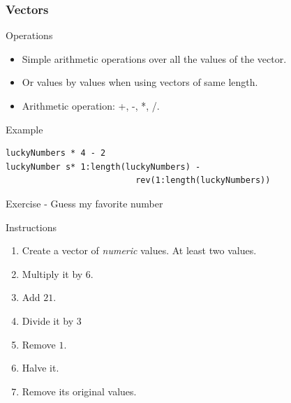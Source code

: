 \documentclass[10pt]{beamer}
\newenvironment{xframe}[2][]
  {\begin{frame}[fragile,environment=xframe,#1]
  \frametitle{#2}}
  {\end{frame}}
\begin{document}

\begin{xframe}{Vectors}
  \begin{block}{Operations}
    \begin{itemize}
    \item Simple arithmetic operations over all the values of the vector.
    \item  Or values by values when using vectors of same length.
    \item Arithmetic operation: +, -, *, /.
    \end{itemize}
  \end{block}
\begin{exampleblock}{Example}
\begin{verbatim}
luckyNumbers * 4 - 2
luckyNumber s* 1:length(luckyNumbers) - 
                          rev(1:length(luckyNumbers))
\end{verbatim}
  \end{exampleblock}
\end{xframe}


\begin{frame}{Exercise - Guess my favorite number}
  \begin{block}{Instructions}
    \begin{enumerate}
    \item Create a vector of {\it numeric} values. At least two values.
    \item Multiply it by $6$.
    \item Add $21$.
    \item Divide it by $3$ 
    \item Remove $1$.
    \item Halve it.
    \item Remove its original values.
    \end{enumerate}
  \end{block}

  \note{}
\end{frame}


\end{document}

